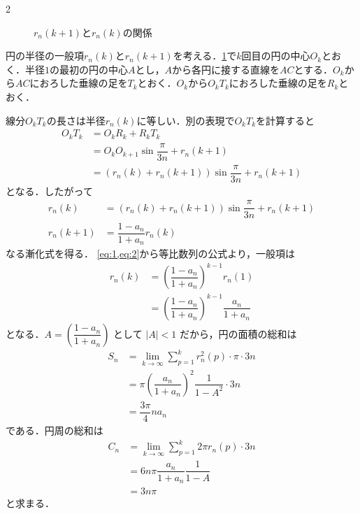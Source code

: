 \documentclass[../../main.tex]{subfiles}
\begin{document}
\begin{multicols}{2}
\begin{figure}[H]
\begin{tikzpicture}[scale=2]
    \end{tikzpicture}
    \caption{$r_n(k+1)$と$r_{n}(k)$の関係}
    \label{1999-2:fig:3}
  \end{figure}

  円の半径の一般項$r_n(k)$と$r_n(k+1)$を考える．\cref{1999-2:fig:3}で$k$回目の円の中心$O_k$とおく．半径$1$の最初の円の中心$A$とし，$A$から各円に接する直線を$AC$とする．$O_k$から$AC$におろした垂線の足を$T_k$とおく．$O_k$から$O_kT_k$におろした垂線の足を$R_k$とおく．

  線分$O_kT_k$の長さは半径$r_n(k)$に等しい．別の表現で$O_kT_k$を計算すると
  \begin{align}
    O_kT_k
    & = O_kR_k + R_kT_k                                           \\
    & = O_kO_{k+1}\sin\dfrac{\pi}{3n} + r_n(k+1)                   \\
    & = \left(r_n(k)+r_n(k+1)\right)\sin\dfrac{\pi}{3n} + r_n(k+1)
  \end{align}
  となる．したがって
  \begin{align}
    r_n(k)   & = \left(r_n(k)+r_n(k+1)\right)\sin\dfrac{\pi}{3n} + r_n(k+1) \\
    r_n(k+1) & = \dfrac{1-a_n}{1+a_n}r_n(k) \label{eq:2}
  \end{align}
  なる漸化式を得る．
  \cref{eq:1,eq:2}から等比数列の公式より，一般項は
  \begin{align}
    r_n(k)
    & = \left(\dfrac{1-a_n}{1+a_n}\right)^{k-1} r_n(1)           \\
    & = \left(\dfrac{1-a_n}{1+a_n}\right)^{k-1}\dfrac{a_n}{1+a_n}
  \end{align}
  となる．$A = \left(\dfrac{1-a_n}{1+a_n}\right)$ として $|A|<1$ だから，円の面積の総和は
  \begin{align}
    S_n
    & = \lim_{k \to \infty} \sum_{p=1}^{k} r^2_n(p) \cdot \pi \cdot 3n \\
    & = \pi \left(\dfrac{a_n}{1+a_n}\right)^2 \dfrac{1}{1-A^2} \cdot 3n  \\
    & = \dfrac{3\pi}{4} n a_n  \label{eq:3}
  \end{align}
  である．円周の総和は
  \begin{align}
    C_n
    & = \lim_{k\to\infty} \sum_{p=1}^{k} 2\pi r_n(p) \cdot 3n \\
    & = 6n\pi \dfrac{a_n}{1+a_n} \dfrac{1}{1-A}              \\
    & = 3n\pi \label{eq:4}
  \end{align}
  と求まる．


\end{multicols}
\end{document}
